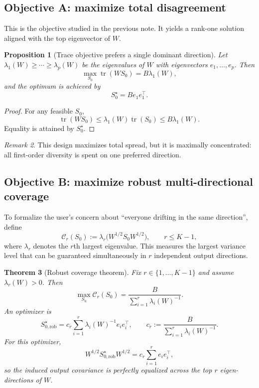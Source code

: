 \documentclass[11pt]{article}
\newcommand{\tr}{\operatorname{tr}}
\newtheorem{theorem}{Theorem}
\newtheorem{proposition}[theorem]{Proposition}
\theoremstyle{remark}
\newtheorem{remark}[theorem]{Remark}
\begin{document}
\subsection*{Objective A: maximize total disagreement}

This is the objective studied in the previous note. It yields a rank-one solution aligned with the top eigenvector of $W$.

\begin{proposition}[Trace objective prefers a single dominant direction]
\label{prop:trace-objective}
Let $\lambda_1(W)\ge\cdots\ge\lambda_p(W)$ be the eigenvalues of $W$ with eigenvectors $e_1,\dots,e_p$. Then
\[
\max_{S_0}\tr(WS_0)=B\lambda_1(W),
\]
and the optimum is achieved by
\[
S_0^\star = B e_1 e_1^\top.
\]
\end{proposition}

\begin{proof}
For any feasible $S_0$,
\[
\tr(WS_0)\le \lambda_1(W)\tr(S_0)\le B\lambda_1(W).
\]
Equality is attained by $S_0^\star$.
\end{proof}

\begin{remark}
This design maximizes total spread, but it is maximally concentrated: all first-order diversity is spent on one preferred direction.
\end{remark}

\subsection*{Objective B: maximize robust multi-directional coverage}

To formalize the user's concern about ``everyone drifting in the same direction'', define
\[
\mathcal C_r(S_0):=\lambda_r\bigl(W^{1/2}S_0W^{1/2}\bigr),
\qquad
r\le K-1,
\]
where $\lambda_r$ denotes the $r$th largest eigenvalue. This measures the largest variance level that can be guaranteed simultaneously in $r$ independent output directions.

\begin{theorem}[Robust coverage theorem]
\label{thm:robust-coverage}
Fix $r\in\{1,\dots,K-1\}$ and assume $\lambda_r(W)>0$. Then
\[
\max_{S_0}\mathcal C_r(S_0)
=
\frac{B}{\sum_{i=1}^r \lambda_i(W)^{-1}}.
\]
An optimizer is
\begin{equation}
S_{0,\mathrm{rob}}^\star
=
c_r \sum_{i=1}^r \lambda_i(W)^{-1} e_i e_i^\top,
\qquad
c_r:=\frac{B}{\sum_{i=1}^r \lambda_i(W)^{-1}}.
\label{eq:robust-opt}
\end{equation}
For this optimizer,
\[
W^{1/2}S_{0,\mathrm{rob}}^\star W^{1/2}
=
c_r \sum_{i=1}^r e_i e_i^\top,
\]
so the induced output covariance is perfectly equalized across the top $r$ eigen-directions of $W$.
\end{theorem}
\end{document}
